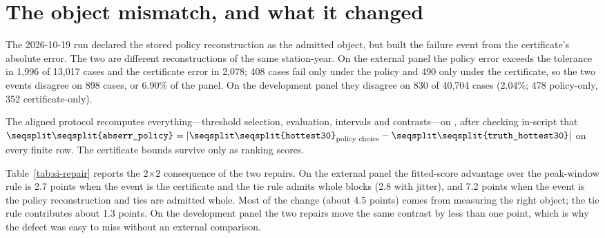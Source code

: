 \documentclass[draft]{agujournal2025}
\let\wrrtexttt\texttt
\renewcommand{\texttt}[1]{\wrrtexttt{\seqsplit{#1}}}
\begin{document}
\section{The object mismatch, and what it changed}

The 2026-10-19 run declared the stored policy reconstruction as the admitted
object, but built the failure event from the certificate's absolute error. The
two are different reconstructions of the same station-year. On the external
panel the policy error exceeds the tolerance in 1{,}996 of 13{,}017 cases and the
certificate error in 2{,}078; 408 cases fail only under the policy and 490 only
under the certificate, so the two events disagree on 898 cases, or 6.90\% of the
panel. On the development panel they disagree on 830 of 40{,}704 cases
(2.04\%; 478 policy-only, 352 certificate-only).

The aligned protocol recomputes everything---threshold selection, evaluation,
intervals and contrasts---on \texttt{abserr\_policy}, after checking in-script
that $\texttt{abserr\_policy}=|\texttt{hottest30}_{\text{policy choice}} -
\texttt{truth\_hottest30}|$ on every finite row. The certificate bounds survive
only as ranking scores.

Table~\ref{tab:si-repair} reports the 2$\times$2 consequence of the two repairs.
On the external panel the fitted-score advantage over the peak-window rule is
2.7 points when the event is the certificate and the tie rule admits whole blocks
(2.8 with jitter), and 7.2 points when the event is the policy reconstruction and
ties are admitted whole.
Most of the change (about 4.5 points) comes from measuring the right object; the
tie rule contributes about 1.3 points. On the development panel the two repairs
move the same contrast by less than one point, which is why the defect was easy
to miss without an external comparison.
\end{document}
